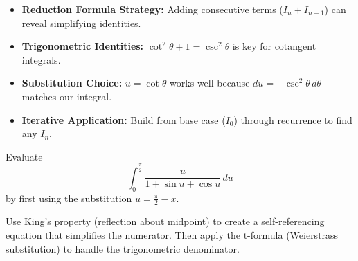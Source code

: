 \begin{takeaways}
\begin{itemize}
\item \textbf{Reduction Formula Strategy:} Adding consecutive terms ($I_n + I_{n-1}$) can reveal simplifying identities.
\item \textbf{Trigonometric Identities:} $\cot^2\theta + 1 = \csc^2\theta$ is key for cotangent integrals.
\item \textbf{Substitution Choice:} $u = \cot\theta$ works well because $du = -\csc^2\theta \, d\theta$ matches our integral.
\item \textbf{Iterative Application:} Build from base case ($I_0$) through recurrence to find any $I_n$.
\end{itemize}
\end{takeaways}

\vspace{1.5cm}


\begin{problem}
Evaluate
\[
\int_0^{\frac{\pi}{2}} \frac{u}{1 + \sin u + \cos u} \, du
\]
by first using the substitution $u = \frac{\pi}{2} - x$.
\end{problem}

\begin{hint}
Use King's property (reflection about midpoint) to create a self-referencing equation that simplifies the numerator. Then apply the t-formula (Weierstrass substitution) to handle the trigonometric denominator.
\end{hint}

